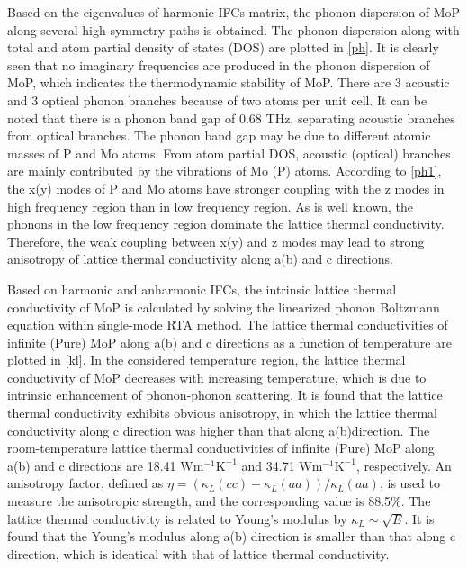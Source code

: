 \documentclass[twocolumn,showkeys,aps,prb,showpacs]{revtex4-1}
\begin{document}
Based on the eigenvalues of harmonic IFCs matrix, the phonon dispersion of
 MoP along several high symmetry paths is obtained.  The phonon dispersion along with total and atom partial density of states (DOS) are plotted in \autoref{ph}. It is clearly seen that no imaginary frequencies are produced in the phonon dispersion of
 MoP, which indicates the thermodynamic stability of MoP.
There are 3 acoustic and 3 optical phonon branches because of two atoms  per unit cell. It can be noted  that
there is  a phonon band gap of 0.68 THz, separating acoustic branches from optical branches.
 The phonon band gap may be due to different atomic masses of P and Mo atoms\cite{m1,m3}.
 From atom partial DOS, acoustic (optical) branches
are mainly contributed by the vibrations of
Mo (P) atoms. According to \autoref{ph1}, the x(y) modes of P and Mo atoms  have stronger coupling with the z modes in high frequency region than in low frequency region. As is well known, the phonons in the low frequency region dominate the lattice thermal conductivity. Therefore, the weak  coupling between x(y) and z modes may lead to strong anisotropy of lattice thermal conductivity along a(b) and c directions.

Based on harmonic and anharmonic IFCs, the intrinsic lattice thermal conductivity of MoP  is calculated by solving the linearized phonon Boltzmann equation within single-mode RTA method.
The lattice thermal conductivities  of infinite (Pure)  MoP along a(b) and c directions as a function of temperature are plotted in \autoref{kl}.
In the considered temperature region, the
lattice thermal conductivity of MoP  decreases with increasing temperature,  which is due to
intrinsic enhancement of phonon-phonon scattering.
It is found that the lattice thermal conductivity
 exhibits obvious anisotropy, in which the lattice thermal conductivity
along  c direction  was higher than that along  a(b)direction.
The room-temperature lattice thermal conductivities of infinite (Pure) MoP along a(b) and c directions are 18.41  $\mathrm{W m^{-1} K^{-1}}$ and  34.71  $\mathrm{W m^{-1} K^{-1}}$, respectively. An anisotropy factor\cite{q12},  defined as $\eta=(\kappa_{L}(cc)-\kappa_{L}(aa))/\kappa_{L}(aa)$, is used to measure the anisotropic strength, and the corresponding value is 88.5\%.  The lattice thermal conductivity is related to Young's modulus by $\kappa_L\sim \sqrt{E}$\cite{q16}.  It is found that the Young's modulus along a(b) direction is smaller than that along c direction, which is identical with that of lattice thermal conductivity.
\end{document}
